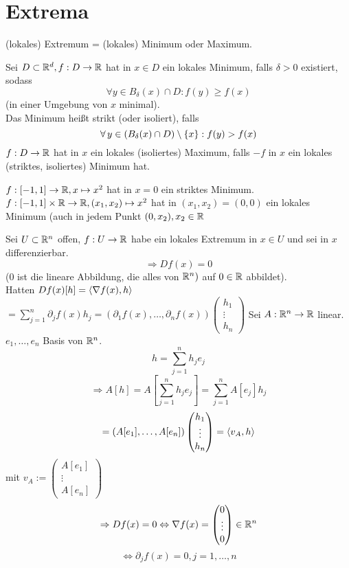 \documentclass[../ana2.tex]{subfiles}
\begin{document}
\setcounter{section}{13}
\section{Extrema}
(lokales) Extremum = (lokales) Minimum oder Maximum.
\begin{defi}
    Sei \(D \subset \mathbb{R}^d, f:D\rightarrow \mathbb{R}\) hat in \(x \in D\)
    ein lokales Minimum, falls \(\delta > 0\) existiert, sodass
    \[ \forall y \in B_\delta(x) \cap D: f(y) \geq f(x) \]
    (in einer Umgebung von \(x\) minimal). \\
    Das Minimum heißt strikt (oder isoliert), falls 
    \[ \forall y \in (B_\delta(x) \cap D) \setminus \set{x}: f(y) > f(x) \]
    \( f:D\rightarrow \mathbb{R} \) hat in \(x\) ein lokales (isoliertes) Maximum,
    falls \(-f\) in \(x\) ein lokales (striktes, isoliertes) Minimum hat.
\end{defi}
\begin{bsp}
    \(f:[-1, 1]\rightarrow \mathbb{R}, x \mapsto x^2\) hat in \(x = 0\) ein striktes Minimum.\\
    \( f:[-1,1]\times \mathbb{R}\rightarrow \mathbb{R}, (x_1, x_2) \mapsto x^2 \) hat in 
    \((x_1, x_2) = (0,0)\) ein lokales Minimum (auch in jedem Punkt 
    \((0, x_2), x_2 \in \mathbb{R} \)
\end{bsp}
\begin{satz}
    Sei \(U\subset \mathbb{R}^n\) offen, \(f:U\rightarrow \mathbb{R}\) habe ein lokales Extremum
    in \(x \in U\) und sei in \(x\) differenzierbar.
    \[ \Rightarrow Df(x) = 0 \]
    (\(0\) ist die lineare Abbildung, die alles von \(\mathbb{R}^n)\) auf \(0 \in \mathbb{R}\)
    abbildet).\\
    Hatten \(Df(x)[h] = \langle \nabla f(x), h \rangle \)\\
    \( = \sum_{j=1}^n \partial_j f(x) h_j = (\partial_1 f(x), \ldots, \partial_n f(x)) \begin{pmatrix}
        h_1\\
        \vdots\\
        h_n
    \end{pmatrix} \)
    Sei \(A:\mathbb{R}^n\rightarrow \mathbb{R}\) linear. \(e_1, \ldots, e_n\) Basis von \(\mathbb{R}^n\).
    \[ h = \sum_{j = 1}^{n} h_j e_j \]
    \[ \Rightarrow A[h] = A[\sum_{j = 1}^{n} h_j e_j ] = \sum_{j=1}^n A[e_j]h_j \]
    \[ = (A[e_1], \ldots, A[e_n]) \begin{pmatrix}
        h_1\\
        \vdots\\
        h_n
    \end{pmatrix} = \langle v_A, h \rangle \]
    mit \(v_A := \begin{pmatrix}
        A[e_1]\\
        \vdots\\
        A[e_n]
    \end{pmatrix}\)
    \[ \Rightarrow Df(x) = 0 \Leftrightarrow \nabla f(x) = \begin{pmatrix}
        0\\
        \vdots\\
        0
    \end{pmatrix} \in \mathbb{R}^n \]
    \[ \Leftrightarrow \partial_jf(x) = 0, j=1,\ldots,n \]
\end{satz}
\end{document}
